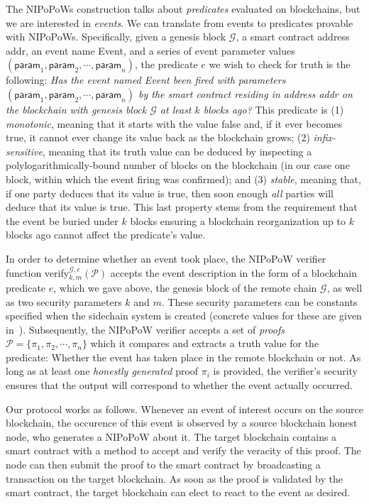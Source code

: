 The NIPoPoWs construction talks about \emph{predicates} evaluated on
blockchains, but we are interested in \emph{events}. We can translate from
events to predicates provable with NIPoPoWs. Specifically, given a genesis block
$\mathcal{G}$, a smart contract address \textsf{addr}, an event name
\textsf{Event}, and a series of event parameter values $(\textsf{param}_1,
\textsf{param}_2, \cdots, \textsf{param}_n)$, the predicate $e$ we wish to check
for truth is the following: \emph{Has the event named \textsf{Event} been fired
with parameters $(\textsf{param}_1, \textsf{param}_2, \cdots, \textsf{param}_n)$
by the smart contract residing in address \textsf{addr} on the blockchain with
genesis block $\mathcal{G}$ at least $k$ blocks ago?} This predicate
is (1) \emph{monotonic}, meaning that it starts with the value \textsf{false}
and, if it ever becomes \textsf{true}, it cannot ever change its value back as
the blockchain grows; (2) \emph{infix-sensitive}, meaning that its truth value
can be deduced by inspecting a polylogarithmically-bound number of blocks on the
blockchain (in our case one block, within which the event firing was confirmed);
and (3) \emph{stable}, meaning that, if one party deduces that its value is
\textsf{true}, then soon enough \emph{all} parties will deduce that its value is
\textsf{true}. This last property stems from the requirement that the event be
buried under $k$ blocks ensuring a blockchain reorganization up to $k$ blocks
ago cannot affect the predicate's value.

In order to determine whether an event took place, the NIPoPoW verifier function
\textsf{verify}$^{\mathcal{G},e}_{k,m}(\mathcal{P})$ accepts the event
description in the form of a blockchain predicate $e$, which we gave above, the
genesis block of the remote chain $\mathcal{G}$, as well as two security
parameters $k$ and $m$. These security parameters can be constants specified
when the sidechain system is created (concrete values for these are given
in~\cite{nipopows}). Subsequently, the NIPoPoW verifier accepts a set of
\emph{proofs} $\mathcal{P} = \{\pi_1, \pi_2, \cdots, \pi_n\}$ which it compares
and extracts a truth value for the predicate: Whether the event has taken place
in the remote blockchain or not. As long as at least one \emph{honestly
generated} proof $\pi_i$ is provided, the verifier's security ensures that the
output will correspond to whether the event actually occurred.

Our protocol works as follows. Whenever an event of interest occurs on the
source blockchain, the occurence of this event is observed by a source
blockchain honest node, who generates a NIPoPoW about it. The target blockchain
contains a smart contract with a method to accept and verify the veracity of
this proof. The node can then submit the proof to the smart contract by
broadcasting a transaction on the target blockchain. As soon as the proof is
validated by the smart contract, the target blockchain can elect to react to the
event as desired.

